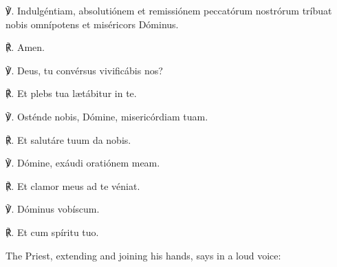 {℣. Indulgéntiam, {} absolutiónem et remissiónem peccatórum nostrórum tríbuat nobis omnípotens et miséricors Dóminus.

℟. Amen.

℣. Deus, tu convérsus vivificábis nos?

℟. Et plebs tua l{\ae}tábitur in te.

℣. Osténde nobis, Dómine, misericórdiam tuam.

℟. Et salutáre tuum da nobis.

℣. Dómine, exáudi oratiónem meam.

℟. Et clamor meus ad te véniat.

℣. Dóminus vobíscum.

℟. Et cum spíritu tuo.}

\begin{rubric}
    The Priest, extending and joining his hands, says in a loud voice:
\end{rubric}

